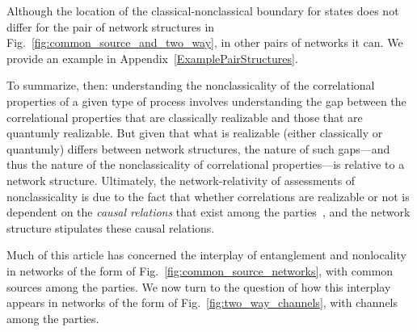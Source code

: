 \documentclass[12pt]{article}
\theoremstyle{plain}
\theoremstyle{definition}
\begin{document}
 Although the location of the classical-nonclassical boundary for states does not differ for the pair of network structures in Fig.~\ref{fig:common_source_and_two_way}, in other pairs of networks it can.  We provide an example in Appendix~\ref{ExamplePairStructures}.

To summarize, then: understanding the nonclassicality of the correlational properties of a given type of process involves understanding the  gap between the correlational properties that are classically realizable and those that are quantumly realizable. But given that what is realizable (either classically or quantumly) differs between network structures, the nature of such gaps---and thus the nature of the nonclassicality of correlational properties---is relative to a network structure. 
 Ultimately, the network-relativity of assessments of nonclassicality is due to the fact that whether correlations are realizable or not  is dependent on the {\em causal relations} that exist among the parties~\cite{Wood2015,schmid2020unscrambling}, and the network structure stipulates these causal relations.

 Much of this article has concerned the interplay of entanglement and nonlocality in networks of the form of Fig.~\ref{fig:common_source_networks}, with common sources among the parties.  We now turn to the question of how this interplay appears in networks of the form of Fig.~\ref{fig:two_way_channels}, with channels among the parties.
\end{document}
